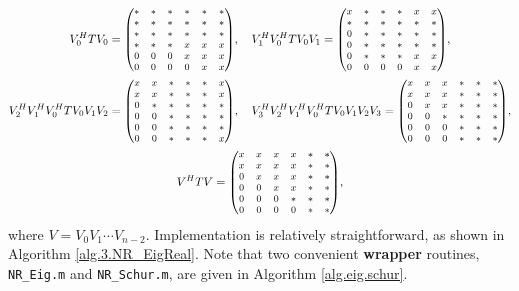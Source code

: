 \begin{gather*}
  V^H_0 T V_0 = {\footnotesize\begin{pmatrix} * & * & * & * & * & * \\ * & * & * & * & * & * \\ * & * & * & * & * & * \\ * & * & * & x & x & x \\ 0 & 0 & 0 & x & x & x \\ 0 & 0 & 0 & 0 & x & x \end{pmatrix}}, \quad 
  V^H_1 V^H_0 T V_0 V_1 = {\footnotesize\begin{pmatrix} x & * & * & * & x & x \\ * & * & * & * & * & * \\ 0 & * & * & * & * & * \\ 0 & * & * & * & * & * \\ 0 & * & * & * & x & x \\ 0 & 0 & 0 & 0 & x & x \end{pmatrix}}, \\
  V^H_2  V^H_1 V^H_0 T V_0  V_1 V_2 = {\footnotesize\begin{pmatrix} x & x & * & * & * & x \\ x & x & * & * & * & x \\ 0 & * & * & * & * & * \\ 0 & 0 & * & * & * & * \\ 0 & 0 & * & * & * & * \\ 0 & 0 & * & * & * & x \end{pmatrix}}, \quad
  V^H_3 V^H_2  V^H_1 V^H_0 T V_0 V_1 V_2 V_3 = {\footnotesize\begin{pmatrix} x & x & x & * & * & * \\ x & x & x & * & * & * \\ 0 & x & x & * & * & * \\ 0 & 0 & * & * & * & * \\ 0 & 0 & 0 & * & * & * \\ 0 & 0 & 0 & * & * & * \end{pmatrix}}, \\
  V^H T V = {\footnotesize\begin{pmatrix} x & x & x & x & * & * \\ x & x & x & x & * & * \\ 0 & x & x & x & * & * \\ 0 & 0 & x & x & * & * \\ 0 & 0 & 0 & * & * & * \\ 0 & 0 & 0 & 0 & * & * \end{pmatrix}},
\end{gather*}
where $V=V_0 V_1 \cdots V_{n-2}$.  Implementation is relatively straightforward, as shown in Algorithm \ref{alg.3.NR_EigReal}.  Note that two convenient {\bf wrapper} routines, {\tt NR_Eig.m} and {\tt NR_Schur.m},
are given in Algorithm \ref{alg.eig.schur}.

